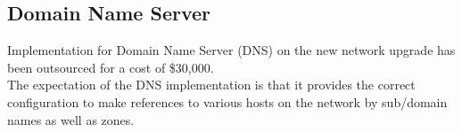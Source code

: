 \subsection{Domain Name Server}
Implementation for Domain Name Server (DNS) on the new network upgrade has 
been outsourced for a cost of \$30,000. \\

\noindent
The expectation of the DNS implementation is that it provides the correct 
configuration to make references to various hosts on the network by sub/domain 
names as well as zones.
